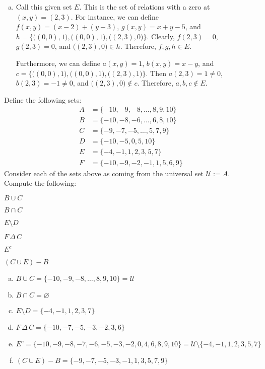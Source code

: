 \documentclass[11pt,letterpaper]{article}
\begin{document}
\begin{enumerate}[(a)]
\item Call this given set $E$. This is the set of relations with a zero at $(x, y)= (2, 3)$. For instance, we can define $f(x, y)= (x - 2) + (y - 3)$, $g(x, y)= x + y - 5$, and $h= \{ \big( (0, 0), 1 \big), \big( (0, 0), 1 \big), \big( (2, 3), 0 \big) \}$. Clearly, $f(2, 3)= 0$, $g(2, 3)= 0$, and $\big( (2, 3), 0 \big) \in h$. Therefore, $f, g, h \in E$. \pspace

Furthermore, we can define $a(x, y)= 1$, $b(x, y)= x - y$, and $c= \{ \big( (0, 0), 1 \big), \big( (0, 0), 1 \big), \big( (2, 3), 1 \big) \}$. Then $a(2, 3)= 1 \neq 0$, $b(2, 3)= -1 \neq 0$, and $\big( (2, 3), 0) \notin c$. Therefore, $a, b, c \notin E$. 
\end{enumerate}



\newpage



 Define the following sets:
	\[
	\begin{aligned}
	A&= \{ -10, -9, -8, \ldots, 8, 9, 10 \} \\
	B&= \{ -10, -8, -6, \ldots, 6, 8, 10 \} \\
	C&= \{ -9, -7, -5, \ldots, 5, 7, 9 \} \\
	D&= \{ -10, -5, 0, 5, 10 \} \\
	E&= \{ -4, -1, 1, 2, 3, 5, 7 \} \\
	F&= \{ -10, -9, -2, -1, 1, 5, 6, 9 \}
	\end{aligned}
	\]
Consider each of the sets above as coming from the universal set $\mathcal{U}:= A$. Compute the following:
	\begin{2enumerate}
	\item $B \cup C$
	\item $B \cap C$
	\item $E \setminus D$
	\item $F \,\Delta\, C$
	\item $E^c$
	\item $(C \cup E) - B$
	\end{2enumerate} \pspace

\sol 
\begin{enumerate}[(a)]
\item $B \cup C= \{ -10, -9, -8, \ldots, 8, 9, 10 \}= \mathcal{U}$
\item $B \cap C= \varnothing$
\item $E \setminus D= \{ -4, -1, 1, 2, 3, 7 \} $
\item $F \,\Delta\, C= \{ -10, -7, -5, -3, -2, 3, 6 \}$
\item $E^c= \{ -10, -9, -8, -7, -6, -5, -3, -2, 0, 4, 6, 8, 9, 10 \}= \mathcal{U} \setminus \{ -4, -1, 1, 2, 3, 5, 7 \}$
\item $(C \cup E) - B= \{ -9, -7, -5, -3, -1, 1, 3, 5, 7, 9 \}$
\end{enumerate}
\end{document}
